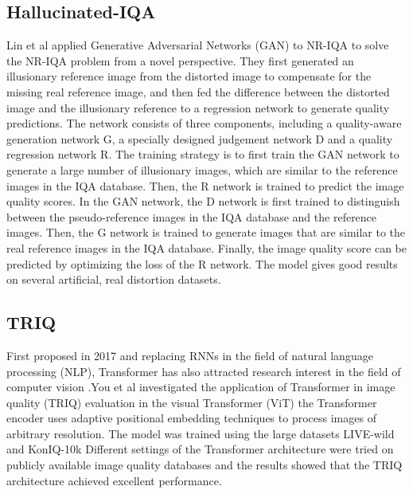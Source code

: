 \documentclass{article}
\begin{document}

\subsection{Hallucinated-IQA}
\label{Hallucinated-IQA}

Lin et al \cite{lin2018hallucinated} applied Generative Adversarial Networks (GAN) to NR-IQA to solve the NR-IQA problem from a novel perspective. They first generated an illusionary reference image from the distorted image to compensate for the missing real reference image, and then fed the difference between the distorted image and the illusionary reference to a regression network to generate quality predictions. The network consists of three components, including a quality-aware generation network G, a specially designed judgement network D and a quality regression network R. The training strategy is to first train the GAN network to generate a large number of illusionary images, which are similar to the reference images in the IQA database. Then, the R network is trained to predict the image quality scores. In the GAN network, the D network is first trained to distinguish between the pseudo-reference images in the IQA database and the reference images. Then, the G network is trained to generate images that are similar to the real reference images in the IQA database. Finally, the image quality score can be predicted by optimizing the loss of the R network. The model gives good results on several artificial, real distortion datasets.


\subsection{TRIQ}
\label{TRIQ}

First proposed in 2017 and replacing RNNs in the field of natural language processing (NLP), Transformer has also attracted research interest in the field of computer vision \cite{carion2020end,DBLP:journals/corr/abs-2010-11929}.You et al \cite{DBLP:journals/corr/abs-2101-01097} investigated the application of Transformer in image quality (TRIQ) evaluation in the visual Transformer (ViT) the Transformer encoder uses adaptive positional embedding techniques to process images of arbitrary resolution. The model was trained using the large datasets LIVE-wild \cite{ghadiyaram2015massive} and KonIQ-10k \cite{lin2018koniq} Different settings of the Transformer architecture were tried on publicly available image quality databases and the results showed that the TRIQ architecture achieved excellent performance. 
\end{document}
